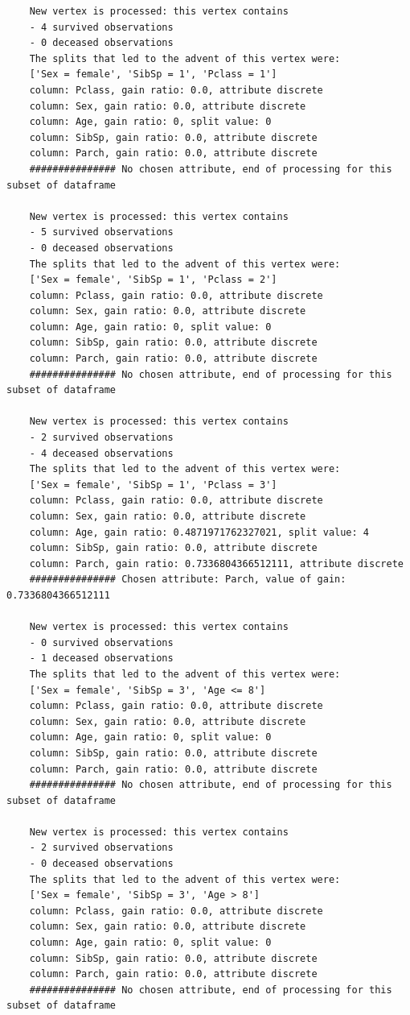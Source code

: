 \documentclass[12pt]{article}
\begin{document}
\begin{verbatim}
	New vertex is processed: this vertex contains
	- 4 survived observations
	- 0 deceased observations
	The splits that led to the advent of this vertex were:
	['Sex = female', 'SibSp = 1', 'Pclass = 1']
	column: Pclass, gain ratio: 0.0, attribute discrete
	column: Sex, gain ratio: 0.0, attribute discrete
	column: Age, gain ratio: 0, split value: 0
	column: SibSp, gain ratio: 0.0, attribute discrete
	column: Parch, gain ratio: 0.0, attribute discrete
	############### No chosen attribute, end of processing for this subset of dataframe
	
	New vertex is processed: this vertex contains
	- 5 survived observations
	- 0 deceased observations
	The splits that led to the advent of this vertex were:
	['Sex = female', 'SibSp = 1', 'Pclass = 2']
	column: Pclass, gain ratio: 0.0, attribute discrete
	column: Sex, gain ratio: 0.0, attribute discrete
	column: Age, gain ratio: 0, split value: 0
	column: SibSp, gain ratio: 0.0, attribute discrete
	column: Parch, gain ratio: 0.0, attribute discrete
	############### No chosen attribute, end of processing for this subset of dataframe
	
	New vertex is processed: this vertex contains
	- 2 survived observations
	- 4 deceased observations
	The splits that led to the advent of this vertex were:
	['Sex = female', 'SibSp = 1', 'Pclass = 3']
	column: Pclass, gain ratio: 0.0, attribute discrete
	column: Sex, gain ratio: 0.0, attribute discrete
	column: Age, gain ratio: 0.4871971762327021, split value: 4
	column: SibSp, gain ratio: 0.0, attribute discrete
	column: Parch, gain ratio: 0.7336804366512111, attribute discrete
	############### Chosen attribute: Parch, value of gain: 0.7336804366512111
	
	New vertex is processed: this vertex contains
	- 0 survived observations
	- 1 deceased observations
	The splits that led to the advent of this vertex were:
	['Sex = female', 'SibSp = 3', 'Age <= 8']
	column: Pclass, gain ratio: 0.0, attribute discrete
	column: Sex, gain ratio: 0.0, attribute discrete
	column: Age, gain ratio: 0, split value: 0
	column: SibSp, gain ratio: 0.0, attribute discrete
	column: Parch, gain ratio: 0.0, attribute discrete
	############### No chosen attribute, end of processing for this subset of dataframe
	
	New vertex is processed: this vertex contains
	- 2 survived observations
	- 0 deceased observations
	The splits that led to the advent of this vertex were:
	['Sex = female', 'SibSp = 3', 'Age > 8']
	column: Pclass, gain ratio: 0.0, attribute discrete
	column: Sex, gain ratio: 0.0, attribute discrete
	column: Age, gain ratio: 0, split value: 0
	column: SibSp, gain ratio: 0.0, attribute discrete
	column: Parch, gain ratio: 0.0, attribute discrete
	############### No chosen attribute, end of processing for this subset of dataframe
	

\end{verbatim}
\end{document}
